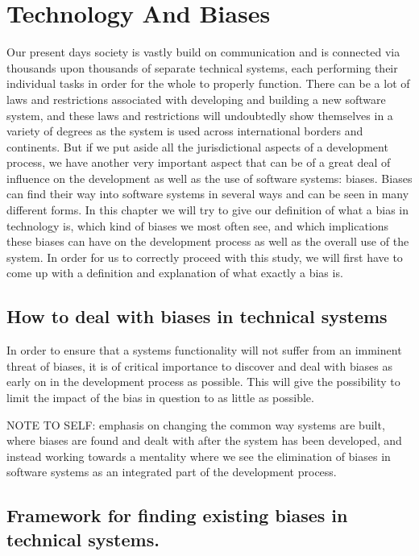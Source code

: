 \section{Technology And Biases}

Our present days society is vastly build on communication and is connected via thousands upon thousands of separate technical systems, each performing their individual tasks in order for the whole to properly function. There can be a lot of laws and restrictions associated with developing and building a new software system, and these laws and restrictions will undoubtedly show themselves in a variety of degrees as the system is used across international borders and continents. But if we put aside all the jurisdictional aspects of a development process, we have another very important aspect that can be of a great deal of influence on the development as well as the use of software systems: biases. Biases can find their way into software systems in several ways and can be seen in many different forms. In this chapter we will try to give our definition of what a bias in technology is, which kind of biases we most often see, and which implications these biases can have on the development process as well as the overall use of the system.
In order for us to correctly proceed with this study, we will first have to come up with a definition and explanation of what exactly a bias is.



\subsection{How to deal with biases in technical systems}
In order to ensure that a systems functionality will not suffer from an imminent threat of biases, it is of critical importance to discover and deal with biases as early on in the development process as possible. This will give the possibility to limit the impact of the bias in question to as little as possible.


NOTE TO SELF: emphasis on changing the common way systems are built, where biases are found and dealt with after the system has been developed, and instead working towards a mentality where we see the elimination of biases in software systems as an integrated part of the development process.
 

\subsection{Framework for finding existing biases in technical systems.}

